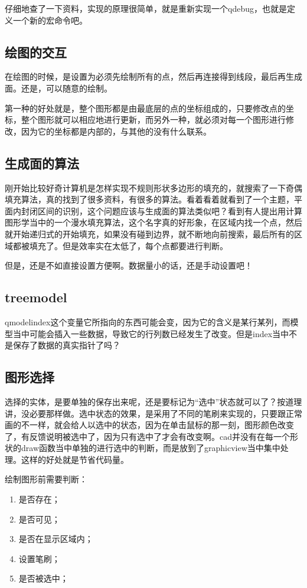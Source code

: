 仔细地查了一下资料，实现的原理很简单，就是重新实现一个qdebug，也就是定义一个新的宏命令吧。
\subsection{绘图的交互}
在绘图的时候，是设置为必须先绘制所有的点，然后再连接得到线段，最后再生成面。还是，可以随意的绘制。

第一种的好处就是，整个图形都是由最底层的点的坐标组成的，只要修改点的坐标，整个图形就可以相应地进行更新，而另外一种，就必须对每一个图形进行修改，因为它的坐标都是内部的，与其他的没有什么联系。
\subsection{生成面的算法}
刚开始比较好奇计算机是怎样实现不规则形状多边形的填充的，就搜索了一下奇偶填充算法，真的找到了很多资料，有很多的算法。看着看着就看到了一个主题，平面内封闭区间的识别，这个问题应该与生成面的算法类似吧？看到有人提出用计算图形学当中的一个漫水填充算法，这个名字真的好形象，在区域内找一个点，然后就开始递归式的开始填充，如果没有碰到边界，就不断地向前搜索，最后所有的区域都被填充了。但是效率实在太低了，每个点都要进行判断。

但是，还是不如直接设置方便啊。数据量小的话，还是手动设置吧！
\subsection{treemodel}
qmodelindex这个变量它所指向的东西可能会变，因为它的含义是某行某列，而模型当中可能会插入一些数据，导致它的行列数已经发生了改变。但是index当中不是保存了数据的真实指针了吗？
\subsection{图形选择}
选择的实体，是要单独的保存出来呢，还是要标记为“选中”状态就可以了？按道理讲，没必要那样做。选中状态的效果，是采用了不同的笔刷来实现的，只要跟正常画的不一样，就会给人以选中的状态，因为在单击鼠标的那一刻，图形颜色改变了，有反馈说明被选中了，因为只有选中了才会有改变啊。cad并没有在每一个形状的draw函数当中单独的进行选中的判断，而是放到了graphicview当中集中处理。这样的好处就是节省代码量。

绘制图形前需要判断：
\begin{enumerate}
	\item 是否存在；
	\item 是否可见；
	\item 是否在显示区域内；
	\item 设置笔刷；
	\item 是否被选中；
\end{enumerate}
